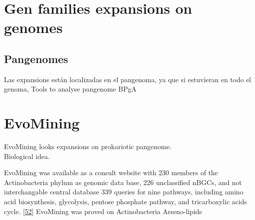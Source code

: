 \documentclass[12pt,twoside]{reedthesis}
\begin{document}
  \begin{Shaded}
  \begin{Highlighting}[]
  \NormalTok{####################################################}
  \NormalTok{####}
  
  
  \StringTok{ } \NormalTok{(}\NormalTok{),} \NormalTok{(}\NormalTok{),}\OperatorTok{+}\OperatorTok{-}
  \OperatorTok{$}
  
  \NormalTok{####################################################################}
  \end{Highlighting}
  \end{Shaded}
  
  \section{Gen families expansions on
  genomes}\label{gen-families-expansions-on-genomes}
  
  \subsection{Pangenomes}\label{pangenomes}
  
  Las expansions están localizadas en el pangenoma, ya que si estuvieran
  en todo el genoma, Tools to analyse pangenome BPgA
  
  \section{EvoMining}\label{evomining-1}
  
  EvoMining looks expansions on prokariotic pangenome.\\
  Biological idea.
  
  EvoMining was available as a consult website with 230 members of the
  Actinobacteria phylum as genomic data base, 226 unclassified nBGCs, and
  not interchangable central database 339 queries for nine pathways,
  including amino acid biosynthesis, glycolysis, pentose phosphate
  pathway, and tricarboxylic acids cycle.
  {[}\protect\hyperlink{ref-cruz-morales_phylogenomic_2016}{52}{]}
  EvoMining was proved on Actinobacteria Arseno-lipids
  
\end{document}
